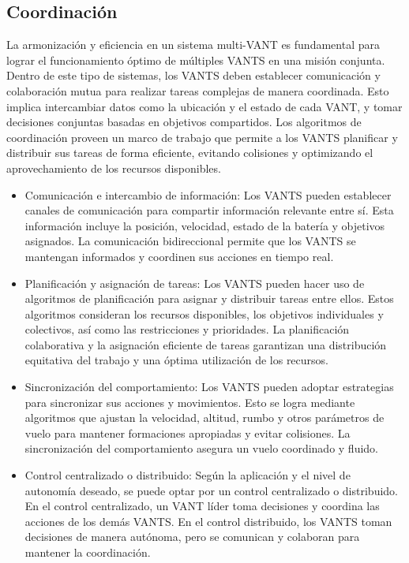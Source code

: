 \documentclass[sigconf]{acmart}
\begin{document}
\subsection*{Coordinación}

La armonización y eficiencia en un sistema multi-VANT es fundamental para lograr el funcionamiento óptimo de múltiples VANTS en una misión conjunta. Dentro de este tipo de sistemas, los VANTS deben establecer comunicación y colaboración mutua para realizar tareas complejas de manera coordinada. Esto implica intercambiar datos como la ubicación y el estado de cada VANT, y tomar decisiones conjuntas basadas en objetivos compartidos. Los algoritmos de coordinación proveen un marco de trabajo que permite a los VANTS planificar y distribuir sus tareas de forma eficiente, evitando colisiones y optimizando el aprovechamiento de los recursos disponibles. %

\begin{itemize}
\item Comunicación e intercambio de información: Los VANTS pueden establecer canales de comunicación para compartir información relevante entre sí. Esta información incluye la posición, velocidad, estado de la batería y objetivos asignados. La comunicación bidireccional permite que los VANTS se mantengan informados y coordinen sus acciones en tiempo real.
\item Planificación y asignación de tareas: Los VANTS pueden hacer uso de algoritmos de planificación para asignar y distribuir tareas entre ellos. Estos algoritmos consideran los recursos disponibles, los objetivos individuales y colectivos, así como las restricciones y prioridades. La planificación colaborativa y la asignación eficiente de tareas garantizan una distribución equitativa del trabajo y una óptima utilización de los recursos.
\item Sincronización del comportamiento: Los VANTS pueden adoptar estrategias para sincronizar sus acciones y movimientos. Esto se logra mediante algoritmos que ajustan la velocidad, altitud, rumbo y otros parámetros de vuelo para mantener formaciones apropiadas y evitar colisiones. La sincronización del comportamiento asegura un vuelo coordinado y fluido.
\item Control centralizado o distribuido: Según la aplicación y el nivel de autonomía deseado, se puede optar por un control centralizado o distribuido. En el control centralizado, un VANT líder toma decisiones y coordina las acciones de los demás VANTS. En el control distribuido, los VANTS toman decisiones de manera autónoma, pero se comunican y colaboran para mantener la coordinación.
\end{itemize}
\end{document}
